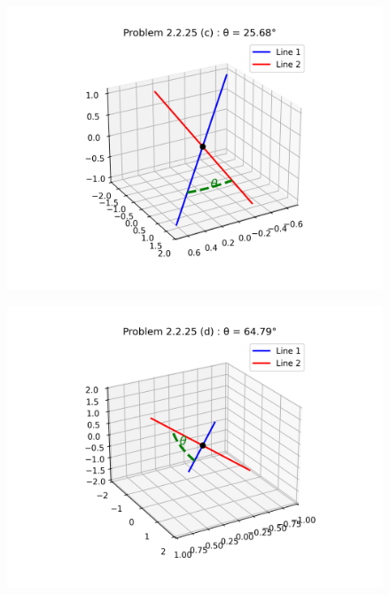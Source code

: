 \documentclass[12pt]{article}
\begin{document}
\begin{multicols}{2}
\begin{figure}[H]
    \centering
    \includegraphics[width=1\columnwidth]{figs/figure_c.png}
    \caption{}
    \label{fig:placeholder}
\end{figure}

\begin{figure}[H]
    \centering
    \includegraphics[width=1\columnwidth]{figs/figure_d.png}
    \caption{}
    \label{fig:placeholder}
\end{figure}

\end{multicols}
\end{document}
